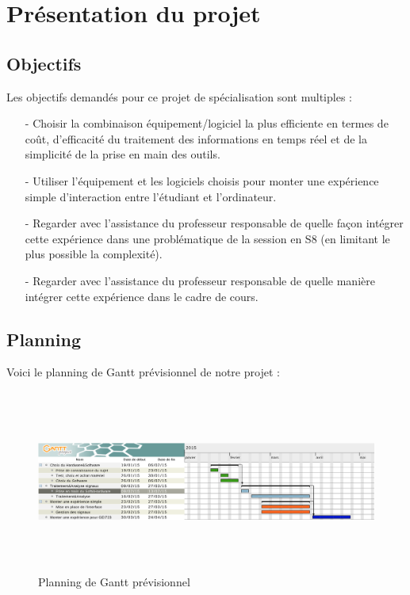 \chapter{Présentation du projet}
\label{Chapitre: Présentation du projet}
\thispagestyle{fancy}

\section {Objectifs}
\label{section: 1.Objectifs}
Les objectifs demandés pour ce projet de spécialisation sont multiples : 
\smallbreak
\begin{itemize}
	\item[-] Choisir la combinaison équipement/logiciel la plus efficiente en termes de coût, d'efficacité du traitement des informations en temps réel et de la simplicité de la prise en main des outils.
	\smallbreak
	\item[-] Utiliser l'équipement et les logiciels choisis pour monter une expérience simple d'interaction entre l'étudiant et l'ordinateur.
	\smallbreak
	\item[-] Regarder avec l'assistance du professeur responsable de quelle façon intégrer cette expérience dans une problématique de la session en S8 (en limitant le plus possible la complexité).
	\smallbreak
	\item[-] Regarder avec l'assistance du professeur responsable de quelle manière intégrer cette expérience dans le cadre de cours. 
\end{itemize}

\section {Planning}
\label{section: 1.Planning}

Voici le planning de Gantt prévisionnel de notre projet :
\begin{figure}[h]
	\centering\includegraphics[width=15cm,height=6cm]{images/gant.png}
	\caption{Planning de Gantt prévisionnel}
\end{figure}
